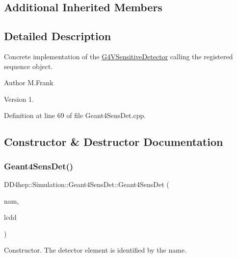 \subsection*{Additional Inherited Members}


\subsection{Detailed Description}
Concrete implementation of the \hyperlink{class_g4_v_sensitive_detector}{G4\+V\+Sensitive\+Detector} calling the registered sequence object. 

\begin{DoxyAuthor}{Author}
M.\+Frank 
\end{DoxyAuthor}
\begin{DoxyVersion}{Version}
1. 
\end{DoxyVersion}


Definition at line 69 of file Geant4\+Sens\+Det.\+cpp.



\subsection{Constructor \& Destructor Documentation}
\hypertarget{class_d_d4hep_1_1_simulation_1_1_geant4_sens_det_a3e1c226eea8d6027fabf211df59fa4c4}{}\label{class_d_d4hep_1_1_simulation_1_1_geant4_sens_det_a3e1c226eea8d6027fabf211df59fa4c4} 
\subsubsection{\texorpdfstring{Geant4\+Sens\+Det()}{Geant4SensDet()}}
{\footnotesize\ttfamily D\+D4hep\+::\+Simulation\+::\+Geant4\+Sens\+Det\+::\+Geant4\+Sens\+Det (\begin{DoxyParamCaption}\item[{const std\+::string \&}]{nam,  }\item[{\hyperlink{class_d_d4hep_1_1_geometry_1_1_l_c_d_d}{Geometry\+::\+L\+C\+DD} \&}]{lcdd }\end{DoxyParamCaption})\hspace{0.3cm}{\ttfamily [inline]}}



Constructor. The detector element is identified by the name. 




